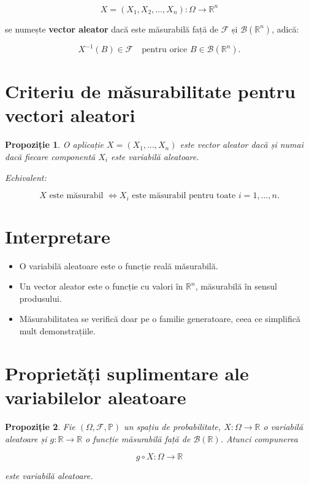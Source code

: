 \documentclass[12pt]{article}
\theoremstyle{plain}
\newtheorem{proposition}{Propoziție}
\begin{document}
\[
X = (X_1, X_2, \dots, X_n) : \Omega \to \mathbb{R}^n
\]



se numește \textbf{vector aleator} dacă este măsurabilă față de
$\mathcal{F}$ și $\mathcal{B}(\mathbb{R}^n)$, adică:



\[
X^{-1}(B) \in \mathcal{F}
\quad \text{pentru orice } B \in \mathcal{B}(\mathbb{R}^n).
\]



\section{Criteriu de măsurabilitate pentru vectori aleatori}

\begin{proposition}
O aplicație $X = (X_1, \dots, X_n)$ este vector aleator dacă și numai dacă
fiecare componentă $X_i$ este variabilă aleatoare.

Echivalent:



\[
X \text{ este măsurabil } \Longleftrightarrow
X_i \text{ este măsurabil pentru toate } i = 1,\dots,n.
\]


\end{proposition}

\section{Interpretare}

\begin{itemize}
    \item O variabilă aleatoare este o funcție reală măsurabilă.
    \item Un vector aleator este o funcție cu valori în $\mathbb{R}^n$,
          măsurabilă în sensul produsului.
    \item Măsurabilitatea se verifică doar pe o familie generatoare,
          ceea ce simplifică mult demonstrațiile.
\end{itemize}

\section{Proprietăți suplimentare ale variabilelor aleatoare}

\begin{proposition}
Fie $(\Omega, \mathcal{F}, \mathbb{P})$ un spațiu de probabilitate,
$X : \Omega \to \mathbb{R}$ o variabilă aleatoare
și $g : \mathbb{R} \to \mathbb{R}$ o funcție măsurabilă față de
$\mathcal{B}(\mathbb{R})$.
Atunci compunerea



\[
g \circ X : \Omega \to \mathbb{R}
\]



este variabilă aleatoare.
\end{proposition}
\end{document}
